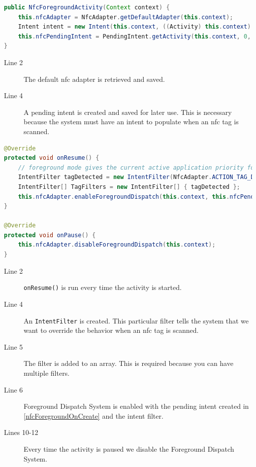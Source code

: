 \begin{lstlisting}[language=java, label=nfcForegroundOnCreate, caption={Initializing the pending intent}]
public NfcForegroundActivity(Context context) { 
    this.nfcAdapter = NfcAdapter.getDefaultAdapter(this.context);
    Intent intent = new Intent(this.context, ((Activity) this.context).getClass());
    this.nfcPendingIntent = PendingIntent.getActivity(this.context, 0, intent ,0);
}
\end{lstlisting}
\begin{description}
\item[Line 2] The default \ac{nfc} adapter is retrieved and saved.
\item[Line 4] A pending intent is created and saved for later use. This is necessary because the system must have an intent to populate when an \ac{nfc} tag is scanned.
\end{description}

\begin{lstlisting}[language=java, caption=Enable Foreground Dispatch System]
@Override
protected void onResume() {
	// foreground mode gives the current active application priority for reading scanned tags
	IntentFilter tagDetected = new IntentFilter(NfcAdapter.ACTION_TAG_DISCOVERED); 
	IntentFilter[] TagFilters = new IntentFilter[] { tagDetected };
	this.nfcAdapter.enableForegroundDispatch(this.context, this.nfcPendingIntent, TagFilters);
}

@Override
protected void onPause() {
    this.nfcAdapter.disableForegroundDispatch(this.context);
}
\end{lstlisting}
\begin{description}
\item[Line 2] \lstinline|onResume()| is run every time the activity is started.
\item[Line 4] An \lstinline|IntentFilter| is created. This particular filter tells the system that we want to override the behavior when an \ac{nfc} tag is scanned.
\item[Line 5] The filter is added to an array. This is required because you can have multiple filters.
\item[Line 6] Foreground Dispatch System is enabled with the pending intent created in \autoref{nfcForegroundOnCreate} and the intent filter.
\item[Lines 10-12] Every time the activity is paused we disable the Foreground Dispatch System.
\end{description}

